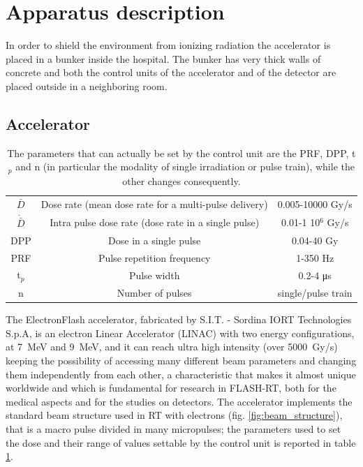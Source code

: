 \section{Apparatus description}
   In order to shield the environment from ionizing radiation the accelerator is placed in a bunker inside the hospital. The bunker has very thick walls of concrete and both the control units of the accelerator and of the detector are placed outside in a neighboring room. 
   \subsection{Accelerator}
      \begin{table}
         \begin{center}
         \begin{tabular}{| c | c | c |}
         \hline
      $\bar{D}$ & Dose rate (mean dose rate for a multi-pulse delivery) & 0.005-10000 Gy/s\\
      $\Dot{\bar{D}}$ & Intra pulse dose rate (dose rate in a single pulse) &  0.01-1 10$^6$ Gy/s  \\
      DPP & Dose in a single pulse & 0.04-40 Gy\\
      PRF & Pulse repetition frequency & 1-350 Hz\\
      t$_{p}$ & Pulse width & 0.2-4 \si{\us}\\
      n & Number of pulses & single/pulse train \\
      \hline
         \end{tabular}
         \caption{The parameters that can actually be set by the control unit are the PRF, DPP, t$_p$ and n (in particular the modality of single irradiation or pulse train), while the other changes consequently.}
         \label{tab:beam_parameters}
         \end{center}
      \end{table}  
      The ElectronFlash accelerator, fabricated by S.I.T. - Sordina IORT Technologies S.p.A, is an electron Linear Accelerator (LINAC) with two energy configurations, at \SI{7}{MeV} and \SI{9}{MeV}, and it can reach ultra high intensity (over \SI{5000}{Gy/s}) keeping the possibility of accessing many different beam parameters and changing them independently from each other, a characteristic that makes it almost unique worldwide and which is fundamental for research in FLASH-RT, both for the medical aspects and for the studies on detectors. 
      The accelerator implements the standard beam structure used in RT with electrons (fig. \ref{fig:beam_structure}), that is a macro pulse divided in many micropulses; the parameters used to set the dose and their range of values settable by the control unit is reported in table \ref{tab:beam_parameters}. 


